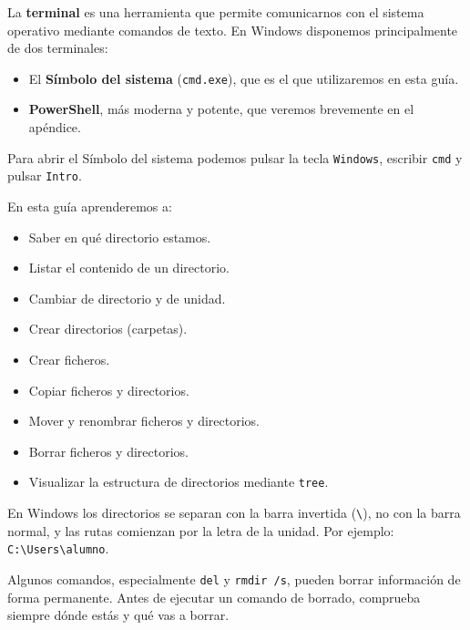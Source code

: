 \documentclass[11pt,a4paper]{article}
\begin{document}
La \textbf{terminal} es una herramienta que permite comunicarnos con el sistema operativo mediante comandos de texto. En Windows disponemos principalmente de dos terminales:

\begin{itemize}
    \item El \textbf{Símbolo del sistema} (\texttt{cmd.exe}), que es el
          que utilizaremos en esta guía.
    \item \textbf{PowerShell}, más moderna y potente, que veremos
          brevemente en el apéndice.
\end{itemize}

\noindent Para abrir el Símbolo del sistema podemos pulsar la tecla
\texttt{Windows}, escribir \texttt{cmd} y pulsar \texttt{Intro}.

\noindent En esta guía aprenderemos a:

\begin{itemize}
    \item Saber en qué directorio estamos.
    \item Listar el contenido de un directorio.
    \item Cambiar de directorio y de unidad.
    \item Crear directorios (carpetas).
    \item Crear ficheros.
    \item Copiar ficheros y directorios.
    \item Mover y renombrar ficheros y directorios.
    \item Borrar ficheros y directorios.
    \item Visualizar la estructura de directorios mediante
          \texttt{tree}.
\end{itemize}

\begin{importante}
En Windows los directorios se separan con la barra invertida
(\texttt{\textbackslash}), no con la barra normal, y las rutas comienzan
por la letra de la unidad. Por ejemplo:
\texttt{C:\textbackslash Users\textbackslash alumno}.
\end{importante}

\begin{peligro}
Algunos comandos, especialmente \texttt{del} y \texttt{rmdir /s},
pueden borrar información de forma permanente. Antes de ejecutar un
comando de borrado, comprueba siempre dónde estás y qué vas a borrar.
\end{peligro}

\end{document}
